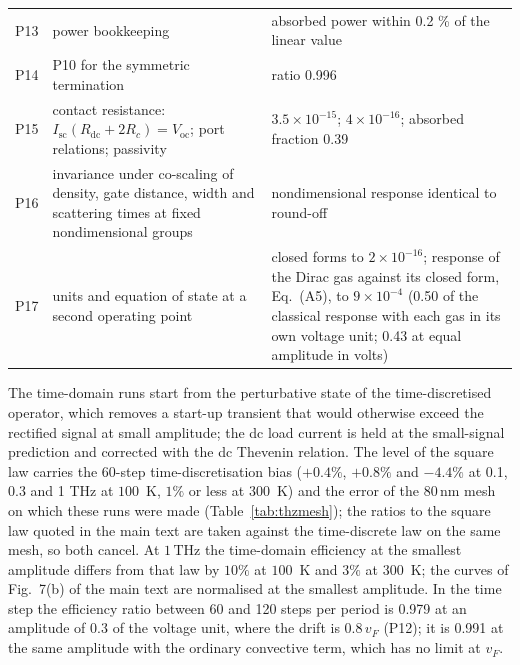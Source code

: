 \documentclass[aps,prapplied,onecolumn,superscriptaddress,floatfix]{revtex4-2}
\newcommand{\nm}{\,\mathrm{nm}}
\newcommand{\THz}{\,\mathrm{THz}}
\begin{document}
\begin{table}[ht]
\begin{ruledtabular}
\begin{tabular}{lp{}p{}}
P13 & power bookkeeping & absorbed power within 0.2 \% of the linear value \\
P14 & P10 for the symmetric termination & ratio 0.996 \\
P15 & contact resistance: $I_{\mathrm{sc}}(R_{\mathrm{dc}}+2R_{c})=V_{\mathrm{oc}}$; port relations; passivity & $3.5\times10^{-15}$; $4\times10^{-16}$; absorbed fraction 0.39 \\
P16 & invariance under co-scaling of density, gate distance, width and scattering times at fixed nondimensional groups & nondimensional response identical to round-off \\
P17 & units and equation of state at a second operating point & closed forms to $2\times10^{-16}$; response of the Dirac gas against its closed form, Eq.~(A5), to $9\times10^{-4}$ (0.50 of the classical response with each gas in its own voltage unit; 0.43 at equal amplitude in volts) \\
\end{tabular}
\end{ruledtabular}
\end{table}

The time-domain runs start from the perturbative state of the
time-discretised operator, which removes a start-up transient that would
otherwise exceed the rectified signal at small amplitude; the dc load
current is held at the small-signal prediction and corrected with the dc
Thevenin relation. The level of the square law carries the 60-step
time-discretisation bias ($+0.4\%$, $+0.8\%$ and $-4.4\%$ at 0.1, 0.3 and
1 THz at $100$~K, $1\%$ or less at $300$~K) and the error of the $80\nm$
mesh on which these runs were made (Table~\ref{tab:thzmesh}); the ratios to the square law
quoted in the main text are taken against the time-discrete law on the
same mesh, so
both cancel. At $1\THz$ the time-domain efficiency at the smallest
amplitude differs from that law by $10\%$ at $100$~K and $3\%$ at
$300$~K; the curves of Fig.~7(b) of the main text are
normalised at the smallest amplitude. In the time step the
efficiency ratio between 60 and 120 steps per period is 0.979 at an
amplitude of $0.3$ of the voltage unit, where the drift is $0.8\,v_{F}$
(P12); it is 0.991 at the same amplitude with the ordinary convective
term, which has no limit at $v_{F}$.
\end{document}

